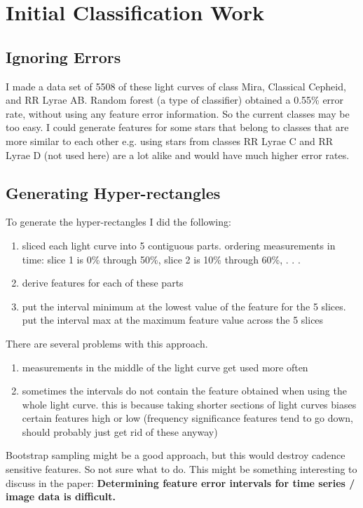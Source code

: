 \documentclass[11pt]{article}
\begin{document}
\section{Initial Classification Work}

\subsection{Ignoring Errors}
I made a data set of 5508 of these light curves of class Mira, Classical Cepheid, and RR Lyrae AB. Random forest (a type of classifier) obtained a 0.55\% error rate, without using any feature error information. So the current classes may be too easy. I could generate features for some stars that belong to classes that are more similar to each other e.g. using stars from classes RR Lyrae C and RR Lyrae D (not used here) are a lot alike and would have much higher error rates.

\subsection{Generating Hyper-rectangles}
To generate the hyper-rectangles I did the following:
\begin{enumerate}
\item sliced each light curve into 5 contiguous parts. ordering measurements in time: slice 1 is 0\% through 50\%, slice 2 is 10\% through 60\%, . . .
\item derive features for each of these parts
\item put the interval minimum at the lowest value of the feature for the 5 slices. put the interval max at the maximum feature value across the 5 slices
\end{enumerate}
There are several problems with this approach.
\begin{enumerate}
\item measurements in the middle of the light curve get used more often
\item sometimes the intervals do not contain the feature obtained when using the whole light curve. this is because taking shorter sections of light curves biases certain features high or low (frequency significance features tend to go down, should probably just get rid of these anyway)
\end{enumerate}
Bootstrap sampling might be a good approach, but this would destroy cadence sensitive features. So not sure what to do. This might be something interesting to discuss in the paper: \textbf{Determining feature error intervals for time series / image data is difficult.}
\end{document}

